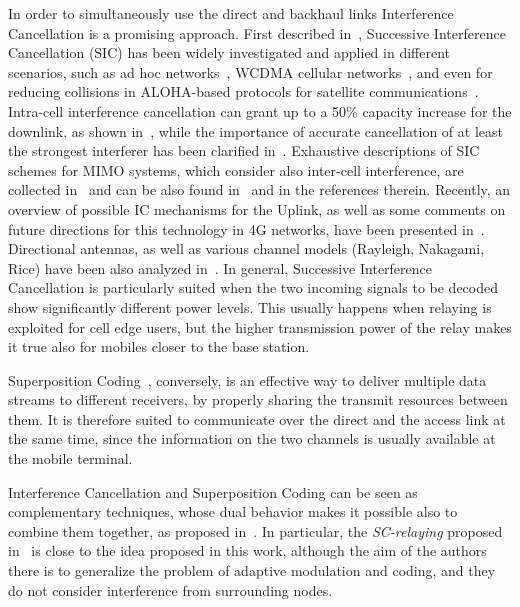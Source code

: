 \documentclass[12pt, letterpaper, onecolumn, draftcls]{IEEEtran}
\begin{document}
In order to simultaneously use the direct and backhaul links Interference Cancellation is a promising approach. First described in~\cite{BroadChannel}, Successive Interference Cancellation (SIC) has been widely investigated and applied in different scenarios, such as ad hoc networks~\cite{Info_SIC}, WCDMA cellular networks~\cite{algo_SIC}, and even for reducing collisions in ALOHA-based protocols for satellite communications~\cite{SIC_CRDSA}.
Intra-cell interference cancellation can grant up to a 50\% capacity increase for the downlink, as shown in~\cite{algo_SIC}, while the importance of accurate cancellation of at least the strongest interferer has been clarified in~\cite{Info_SIC}. Exhaustive descriptions of SIC schemes for MIMO systems, which consider also inter-cell interference, are collected in~\cite{DL_MIMO_SIC} and can be also found in~\cite{MIMO_SIC_survey} and in the references therein.
Recently, an overview of possible IC mechanisms for the Uplink, as well as some comments on future directions for this technology in 4G networks, have been presented in~\cite{SIC_cell}. Directional antennas, as well as various channel models (Rayleigh, Nakagami, Rice) have been also analyzed in~\cite{Cell_SICperf}.
In general, Successive Interference Cancellation is particularly suited when the two incoming signals to be decoded show significantly different power levels. This usually happens when relaying is exploited for cell edge users, but the higher transmission power of the relay makes it true also for mobiles closer to the base station.

Superposition Coding~\cite{BroadChannel}, conversely, is an effective way to deliver multiple data streams to different receivers, by properly sharing the transmit resources between them. It is therefore suited to communicate over the direct and the access link at the same time, since the information on the two channels is usually available at the mobile terminal.

Interference Cancellation and Superposition Coding can be seen as complementary techniques, whose dual behavior makes it possible also to combine them together, as proposed in~\cite{SC_SIC_exp,SC_HARQ,Dave_SC_cog,SC_relay}. In particular, the \textit{SC-relaying} proposed in~\cite{SC_relay} is close to the idea proposed in this work, although the aim of the authors there is to generalize the problem of adaptive modulation and coding, and they do not consider interference from surrounding nodes.
\end{document}
